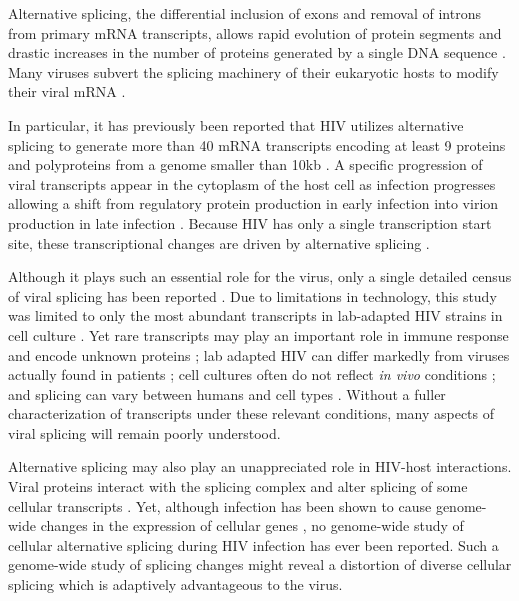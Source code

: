 \documentclass[../sherrill-Mix_thesis.tex]{subfiles}
\begin{document}
	Alternative splicing, the differential inclusion of exons and removal of introns from primary mRNA transcripts, allows rapid evolution of protein segments \citep{Kopelman2005,Xing2005,Su2006} and drastic increases in the number of proteins generated by a single DNA sequence \citep{Watson2005}. Many viruses subvert the splicing machinery of their eukaryotic hosts to modify their viral mRNA \citep{Pollard1998}. 

	In particular, it has previously been reported that HIV utilizes alternative splicing to generate more than 40 mRNA transcripts encoding at least 9 proteins and polyproteins from a genome smaller than 10kb \citep{Purcell1993}. A specific progression of viral transcripts appear in the cytoplasm of the host cell as infection progresses allowing a shift from regulatory protein production in early infection into virion production in late infection \citep{Kim1989,Pomerantz1990,Klotman1991}. Because HIV has only a single transcription start site, these transcriptional changes are driven by alternative splicing \citep{Stoltzfus2009}. 

	 Although it plays such an essential role for the virus, only a single detailed census of viral splicing has been reported \citep{Purcell1993}. Due to limitations in technology, this study was limited to only the most abundant transcripts in lab-adapted HIV strains in cell culture \citep{Purcell1993}. Yet rare transcripts may play an important role in immune response \citep{Bansal2010} and encode unknown proteins \citep{Benko1990}; lab adapted HIV can differ markedly from viruses actually found in patients \citep{Fujita1992};  cell cultures often do not reflect \emph{in vivo} conditions \citep{McAllister1971}; and splicing can vary between humans \citep{Kwan2007,Hull2007} and cell types \citep{Wang2008,Barash2010}. Without a fuller characterization of transcripts under these relevant conditions, many aspects of viral splicing will remain poorly understood.

	Alternative splicing may also play an unappreciated role in HIV-host interactions. Viral proteins interact with the splicing complex \citep{Tange1996,Berro2006,Jager2012} and alter splicing of some cellular transcripts \citep{Kuramitsu2005,Hashizume2007}. Yet, although infection has been shown to cause genome-wide changes in the expression of cellular genes \citep{Vahey2002,Wout2003,Mitchell2003,Rotger2010,Chang2011}, no genome-wide study of cellular alternative splicing during HIV infection has ever been reported. Such a genome-wide study of splicing changes might reveal a distortion of diverse cellular splicing which is adaptively advantageous to the virus. 
\end{document}
